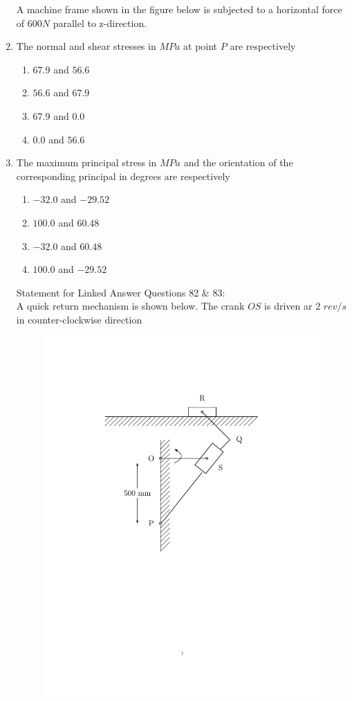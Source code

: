 \documentclass[journal,12pt,onecolumn,article]{IEEEtran}
\theoremstyle{remark}
\begin{document}
\begin{enumerate}
		A machine frame shown in the figure below is subjected to a horizontal force of $600 N$ parallel to z-direction.
	\item The normal and shear stresses in $MPa$ at point $P$ are respectively 
		\begin{enumerate}
			\item $67.9$ and $56.6$
			\item $56.6$ and $67.9$
			\item $67.9$ and $0.0$
			\item $0.0$ and $56.6$	
		\end{enumerate}
	\item The maximum principal stress in $MPa$ and the orientation of the corresponding principal in degrees are respectively 
		\begin{enumerate}
			\item $-32.0$ and $-29.52$
			\item $100.0$ and $60.48$
			\item $-32.0$ and $60.48$
			\item $100.0$ and $-29.52$
		\end{enumerate}
		Statement for Linked Answer Questions 82 \& 83: \\
		A quick return mechanism is shown below. The crank $OS$ is driven ar 2 $rev/s$ in counter-clockwise direction
			\begin{figure}[H]
	\centering
	\includegraphics[width=0.7\linewidth]{figs/fig82/main.pdf}
\end{figure}
\vspace{-70pt}


\end{enumerate}
\end{document}
